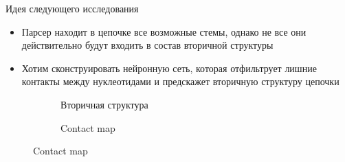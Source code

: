 \documentclass{beamer}
\begin{document}
\begin{frame}{Идея следующего исследования} 
\begin{itemize}
    \item Парсер находит в цепочке все возможные стемы, однако не все они действительно будут входить в состав вторичной структуры
    \item Хотим сконструировать нейронную сеть, которая отфильтрует лишние контакты между нуклеотидами и предскажет вторичную структуру цепочки
\end{itemize}
\vspace{0.5cm}
\begin{figure}
\centering
\begin{subfigure}{.3\textwidth}
  \centering
  \caption{Вторичная структура}
\end{subfigure}%
\begin{subfigure}{.3\textwidth}
  \centering
  \caption{Contact map}

\end{subfigure}
\end{figure}
\end{frame}
\end{document}
